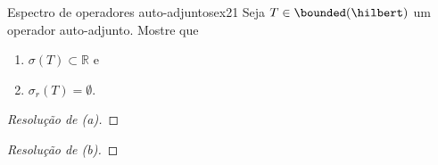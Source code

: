 \begin{exercício}{Espectro de operadores auto-adjuntos}{ex21}
    Seja \(T \in \bounded(\hilbert)\) um operador auto-adjunto. Mostre que
    \begin{enumerate}[label=(\alph*)]
        \item \(\sigma(T) \subset \mathbb{R}\) e
        \item \(\sigma_r(T) = \emptyset.\)
    \end{enumerate}
\end{exercício}
\begin{proof}[Resolução de (a)]

\end{proof}
\begin{proof}[Resolução de (b)]

\end{proof}
